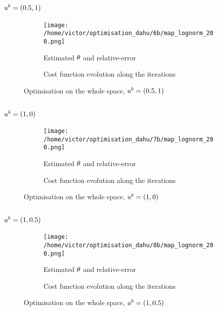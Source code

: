 \documentclass[../../Main_ManuscritThese.tex]{subfiles}
\begin{document}
\subsection*{$u^b=(0.5, 1)$}
\begin{figure}[ht]
  \begin{subfigure}{\textwidth}
  \centering
  \texttt{[image: /home/victor/optimisation\_dahu/6b/map\_lognorm\_200.png]}
  \caption{Estimated $\theta$ and relative-error}
\end{subfigure}
\begin{subfigure}{\textwidth}
  \centering
  \resizebox{1\textwidth}{!}{}
    \caption{Cost function evolution along the iterations}
  \end{subfigure}
  \caption{Optimisation on the whole space, $u^b=(0.5, 1)$}
\end{figure}
\clearpage

\subsection*{$u^b=(1, 0)$}
\begin{figure}[ht]
  \begin{subfigure}{\textwidth}
  \centering
  \texttt{[image: /home/victor/optimisation\_dahu/7b/map\_lognorm\_200.png]}
  \caption{Estimated $\theta$ and relative-error}
\end{subfigure}
\begin{subfigure}{\textwidth}
  \centering
  \resizebox{1\textwidth}{!}{}
    \caption{Cost function evolution along the iterations}
\end{subfigure}
\caption{Optimisation on the whole space, $u^b=(1, 0)$}
\end{figure}
\clearpage
\subsection*{$u^b=(1, 0.5)$}
\begin{figure}[ht]
  \begin{subfigure}{\textwidth}
  \centering
  \texttt{[image: /home/victor/optimisation\_dahu/8b/map\_lognorm\_200.png]}
  \caption{Estimated $\theta$ and relative-error}
\end{subfigure}
\begin{subfigure}{\textwidth}
  \centering
  \resizebox{1\textwidth}{!}{}
    \caption{Cost function evolution along the iterations}
  \end{subfigure}
  \caption{Optimisation on the whole space, $u^b=(1, 0.5)$}
\end{figure}
\clearpage
\end{document}
